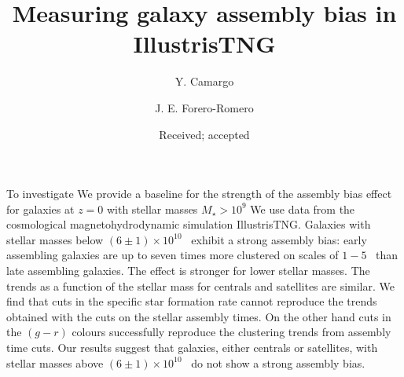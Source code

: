 \documentclass{aa}
\begin{document}
 


   \title{Measuring galaxy assembly bias in IllustrisTNG}


\author{
Y. Camargo  \and 
J. E. Forero-Romero
}


\date{Received; accepted }

 
  \abstract
   {To investigate}
   {We provide a baseline for the strength of the assembly bias effect for galaxies at $z=0$ with stellar masses $M_{\star} > 10^{9}$\Msunh}
   {We use data from the cosmological magnetohydrodynamic simulation IllustrisTNG. }
   {Galaxies with stellar masses below $(6\pm 1)\times
10^{10}$ \Msunh\ exhibit a strong assembly bias: early
assembling galaxies are up to seven times more clustered on scales of $1-5$ \Mpch\ than
late assembling galaxies. The effect is stronger for lower stellar masses.
The trends as a function of the stellar mass for centrals and satellites are similar. 
We find that cuts in the specific star formation rate cannot reproduce
the trends obtained with the cuts on the stellar assembly times.
On the other hand cuts in the $(g-r)$ colours successfully reproduce
the clustering trends from assembly time cuts.  
Our results suggest that galaxies, either centrals or satellites, with
stellar masses above $(6\pm 1)\times 10^{10}$ \Msunh\ do not show a
strong assembly bias.    }
   {}


   \maketitle
%
\end{document}

